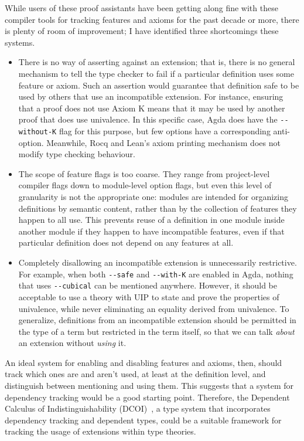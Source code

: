 \documentclass{article}
\newcommand{\code}[1]{\texttt{#1}}
\begin{document}
While users of these proof assistants have been getting along fine
with these compiler tools for tracking features and axioms for the past decade or more,
there is plenty of room of improvement;
I have identified three shortcomings these systems.
%
\begin{itemize}
  \item There is no way of asserting against an extension;
    that is, there is no general mechanism to tell the type checker to fail
    if a particular definition uses some feature or axiom.
    Such an assertion would guarantee that definition safe to be used by others
    that use an incompatible extension.
    For instance, ensuring that a proof does not use Axiom K
    means that it may be used by another proof that does use univalence.
    In this specific case, Agda does have the \code{-{}-without-K} flag for this purpose,
    but few options have a corresponding anti-option.
    Meanwhile, Rocq and Lean's axiom printing mechanism
    does not modify type checking behaviour.
  \item The scope of feature flags is too coarse.
    They range from project-level compiler flags
    down to module-level option flags,
    but even this level of granularity is not the appropriate one:
    modules are intended for organizing definitions by semantic content,
    rather than by the collection of features they happen to all use.
    This prevents reuse of a definition in one module inside another module
    if they happen to have incompatible features,
    even if that particular definition does not depend on any features at all.
  \item Completely disallowing an incompatible extension is unnecessarily restrictive.
    For example, when both \code{-{}-safe} and \code{-{}-with-K} are enabled in Agda,
    nothing that uses \code{-{}-cubical} can be mentioned anywhere.
    However, it should be acceptable to use a theory with UIP
    to state and prove the properties of univalence,
    while never eliminating an equality derived from univalence.
    To generalize, definitions from an incompatible extension
    should be permitted in the type of a term but restricted in the term itself,
    so that we can talk \emph{about} an extension without \emph{using} it.
\end{itemize}

An ideal system for enabling and disabling features and axioms, then,
should track which ones are and aren't used, at least at the definition level,
and distinguish between mentioning and using them.
This suggests that a system for dependency tracking would be a good starting point.
Therefore, the Dependent Calculus of Indistinguishability (DCOI)~\citep{dcoi},
a type system that incorporates dependency tracking and dependent types,
could be a suitable framework for tracking the usage of extensions within type theories.
\end{document}
